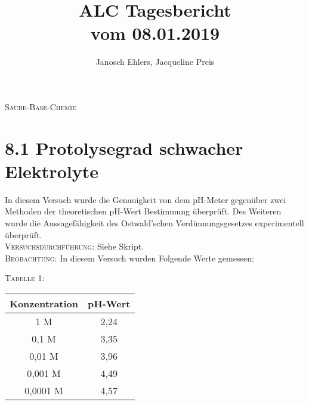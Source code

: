 \documentclass[11pt, a4paper]{article}
\begin{document}
\title{ALC Tagesbericht\\ vom 08.01.2019}
\author{Janosch Ehlers, Jacqueline Preis}
\maketitle

	\begin{center}
	\textsc{Säure-Base-Chemie}
	\end{center}

\section{8.1 Protolysegrad schwacher Elektrolyte}

In diesem Versuch wurde die Genauigkeit von dem pH-Meter gegenüber zwei Methoden der theoretischen pH-Wert Bestimmung überprüft. Des Weiteren wurde die Aussagefähigkeit des Ostwald'schen Verdünnungsgesetzes experimentell überprüft.\\

\textsc{Versuchsdurchführung:} Siehe Skript.\\

\textsc{Beobachtung:}\hspace{5mm} In diesem Versuch wurden Folgende Werte gemessen:\\
\begin{center}

\textsc{Tabelle 1:}\\
\begin{tabular}{cc}
Konzentration & pH-Wert\\
\hline
1 M & 2,24\\
0,1 M & 3,35\\
0,01 M & 3,96\\
0,001 M & 4,49\\
0,0001 M & 4,57\\
\end{tabular}
\end{center}
\end{document}
